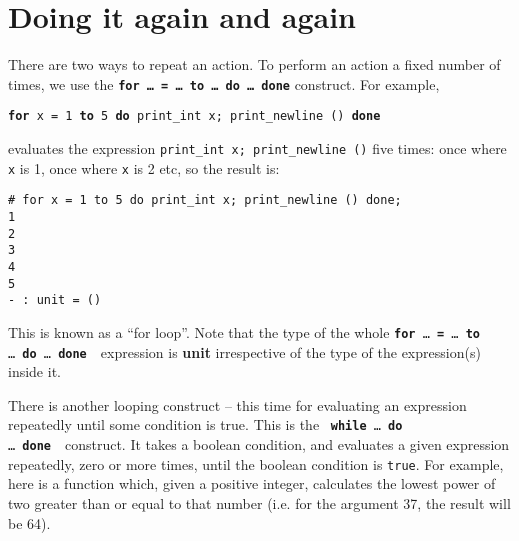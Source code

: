\documentclass[]{book}
\newcommand{\pfor}{\textbf{for}\xspace}
\newcommand{\pto}{\textbf{to}\xspace}
\newcommand{\pdo}{\textbf{do}\xspace}
\newcommand{\pdone}{\textbf{done}\xspace}
\newcommand{\smspace}{\vspace{4mm}}
\begin{document}
\section*{Doing it again and again}

There are two ways to repeat an action. To perform an action a fixed number of times, we use the \texttt{\textbf{for\! \ldots\ \!= \!\ldots\ \!to \ldots\ \!do \ldots\ \!done}} construct. For example,  

\smspace
  \texttt{\pfor x = 1 \pto 5 \pdo print\_int x; print\_newline () \pdone}
\smspace

\noindent evaluates the expression \texttt{print\_int\! x;\! print\_newline\! ()} five times: once where \texttt{x} is 1, once where \texttt{x} is 2 etc, so the result is:

\smspace
\noindent\verb$# for x = 1 to 5 do print_int x; print_newline () done;$\\
\noindent\verb!1!\\
\noindent\verb!2!\\
\noindent\verb!3!\\
\noindent\verb!4!\\
\noindent\verb!5!\\
\noindent\verb!- : unit = ()!
\smspace

\noindent This is known as a ``for loop''. Note that the type of the whole \texttt{\textbf{for}\! \ldots\ \!\textbf{=} \!\ldots\ \!\textbf{to} \!\ldots\ \!\textbf{do} \!\ldots\ \!\textbf{done}}\ \ expression is \textbf{\textsf{unit}} irrespective of the type of the expression(s) inside it.

There is another looping construct -- this time for evaluating an expression repeatedly until some condition is true. This is the \ \texttt{\textbf{while}\! \ldots\ \!\textbf{do}\! \ldots\ \!\textbf{done}}\ \ construct. It takes a boolean condition, and evaluates a given expression repeatedly, zero or more times, until the boolean condition is \texttt{true}. For example, here is a function which, given a positive integer, calculates the lowest power of two greater than or equal to that number (i.e. for the argument 37, the result will be 64).
\end{document}
